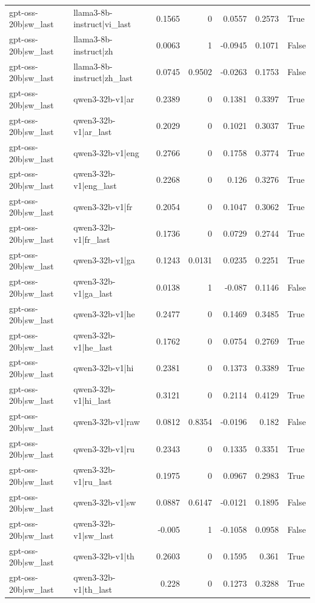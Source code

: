 \begin{table}
\begin{tabular}{l l r r r r l}
gpt-oss-20b|sw_last & llama3-8b-instruct|vi_last & 0.1565 & 0 & 0.0557 & 0.2573 & True \\
gpt-oss-20b|sw_last & llama3-8b-instruct|zh & 0.0063 & 1 & -0.0945 & 0.1071 & False \\
gpt-oss-20b|sw_last & llama3-8b-instruct|zh_last & 0.0745 & 0.9502 & -0.0263 & 0.1753 & False \\
gpt-oss-20b|sw_last & qwen3-32b-v1|ar & 0.2389 & 0 & 0.1381 & 0.3397 & True \\
gpt-oss-20b|sw_last & qwen3-32b-v1|ar_last & 0.2029 & 0 & 0.1021 & 0.3037 & True \\
gpt-oss-20b|sw_last & qwen3-32b-v1|eng & 0.2766 & 0 & 0.1758 & 0.3774 & True \\
gpt-oss-20b|sw_last & qwen3-32b-v1|eng_last & 0.2268 & 0 & 0.126 & 0.3276 & True \\
gpt-oss-20b|sw_last & qwen3-32b-v1|fr & 0.2054 & 0 & 0.1047 & 0.3062 & True \\
gpt-oss-20b|sw_last & qwen3-32b-v1|fr_last & 0.1736 & 0 & 0.0729 & 0.2744 & True \\
gpt-oss-20b|sw_last & qwen3-32b-v1|ga & 0.1243 & 0.0131 & 0.0235 & 0.2251 & True \\
gpt-oss-20b|sw_last & qwen3-32b-v1|ga_last & 0.0138 & 1 & -0.087 & 0.1146 & False \\
gpt-oss-20b|sw_last & qwen3-32b-v1|he & 0.2477 & 0 & 0.1469 & 0.3485 & True \\
gpt-oss-20b|sw_last & qwen3-32b-v1|he_last & 0.1762 & 0 & 0.0754 & 0.2769 & True \\
gpt-oss-20b|sw_last & qwen3-32b-v1|hi & 0.2381 & 0 & 0.1373 & 0.3389 & True \\
gpt-oss-20b|sw_last & qwen3-32b-v1|hi_last & 0.3121 & 0 & 0.2114 & 0.4129 & True \\
gpt-oss-20b|sw_last & qwen3-32b-v1|raw & 0.0812 & 0.8354 & -0.0196 & 0.182 & False \\
gpt-oss-20b|sw_last & qwen3-32b-v1|ru & 0.2343 & 0 & 0.1335 & 0.3351 & True \\
gpt-oss-20b|sw_last & qwen3-32b-v1|ru_last & 0.1975 & 0 & 0.0967 & 0.2983 & True \\
gpt-oss-20b|sw_last & qwen3-32b-v1|sw & 0.0887 & 0.6147 & -0.0121 & 0.1895 & False \\
gpt-oss-20b|sw_last & qwen3-32b-v1|sw_last & -0.005 & 1 & -0.1058 & 0.0958 & False \\
gpt-oss-20b|sw_last & qwen3-32b-v1|th & 0.2603 & 0 & 0.1595 & 0.361 & True \\
gpt-oss-20b|sw_last & qwen3-32b-v1|th_last & 0.228 & 0 & 0.1273 & 0.3288 & True \\

\end{tabular}
\end{table}
